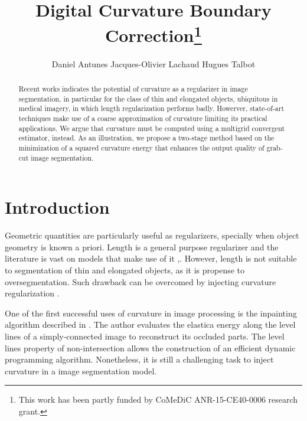\documentclass[runningheads]{llncs}
\begin{document}
%
\title{Digital Curvature Boundary Correction\thanks{This  work has  been  partly  funded by CoMeDiC ANR-15-CE40-0006 research grant.}}

\author{Daniel Antunes
Jacques-Olivier Lachaud
Hugues Talbot}
%
%
%
\maketitle              %
%
\begin{abstract}
Recent works indicates the potential of curvature as a regularizer in image segmentation, in particular for the class of thin and elongated objects, ubiquitous in medical imagery, in which length regularization performs badly. Howerver, state-of-art techniques make use of a coarse approximation of curvature  limiting its practical applications. We argue that curvature must be computed using a multigrid convergent estimator, instead. As an illustration, we propose a two-stage method based on the minimization of a squared curvature energy that enhances the output quality of grab-cut image segmentation.
 
\end{abstract}
%
%
%

\section{Introduction}
Geometric quantities are particularly useful as regularizers, specially when object geometry is known a priori. Length is a general purpose regularizer and the literature is vast on models that make use of it \cite{casseles97},\cite{appleton05}. However, length is not suitable to segmentation of thin and elongated objects, as it is propense to oversegmentation. Such drawback can be overcomed by injecting curvature regularization \cite{zehiry10}.
				
One of the first successful uses of curvature in image processing is the inpainting algorithm described in \cite{masnou98}. The author evaluates the elastica energy along the level lines of a simply-connected image to reconstruct its occluded parts. The level lines property of non-intersection allows the construction of an efficient dynamic programming algorithm. Nonetheless, it is still a challenging task to inject curvature in a image segmentation model. 
\end{document}

